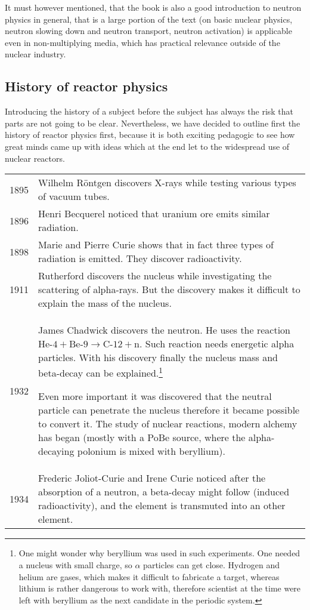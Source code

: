 It must however mentioned, that the book is also a good introduction to neutron physics in general, that is a large portion of the text (on basic nuclear physics, neutron slowing down and neutron transport, neutron activation) is applicable even in non-multiplying media, which has practical relevance outside of the nuclear industry.  

\subsection{History of reactor physics}

Introducing the history of a subject before the subject has always the risk that parts are not going to be clear. Nevertheless, we have decided to outline first the history of reactor physics first, because it is both exciting pedagogic to see how great minds came up with ideas which at the end let to the widespread use of nuclear reactors.

\begin{tabularx}{\textwidth}{c | X}
1895 & Wilhelm R\"ontgen discovers X-rays  while testing various types of vacuum tubes. \\
1896 & Henri  Becquerel noticed that uranium ore emits similar radiation. \\
1898 & Marie and Pierre Curie shows that in fact three types of radiation is emitted. They discover radioactivity. \\
1911 & Rutherford discovers the nucleus while investigating the scattering of alpha-rays. But the discovery makes it difficult to explain the mass of the nucleus. \\
1932 & James Chadwick discovers the neutron. He uses the reaction $\text{He-4} + \text{Be-9} \rightarrow \text{C-12} + \text{n}$. Such reaction needs energetic alpha particles. With his discovery finally the nucleus mass and beta-decay can be explained.\footnote{One might wonder why beryllium was used in such experiments. One needed a nucleus with small charge, so $\alpha$ particles can get close. Hydrogen and helium are gases, which makes it difficult to fabricate a target, whereas lithium is rather dangerous to work with, therefore scientist at the time were left with beryllium as the next candidate in the periodic system.}
 
Even more important it was discovered that the neutral particle can penetrate the nucleus therefore it became possible to convert it.  The study of nuclear reactions, modern alchemy has began (mostly with a PoBe source, where the alpha-decaying polonium is mixed with beryllium). \\
1934 & Frederic Joliot-Curie and Irene Curie noticed after the absorption of a neutron, a beta-decay might follow (induced radioactivity), and the element is transmuted into an other element. 
\end{tabularx}

